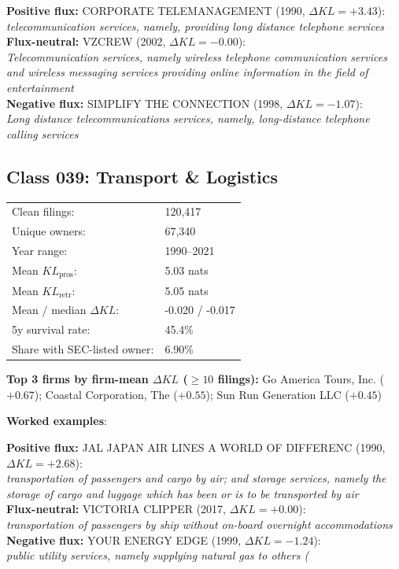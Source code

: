   \textbf{Positive flux:} \textsc{CORPORATE TELEMANAGEMENT} (1990, $\Delta KL=+3.43$):\\
  \textit{telecommunication services, namely, providing long distance telephone services}\\
  \textbf{Flux-neutral:} \textsc{VZCREW} (2002, $\Delta KL=-0.00$):\\
  \textit{Telecommunication services, namely wireless telephone communication services and wireless messaging services providing online information in the field of entertainment}\\
  \textbf{Negative flux:} \textsc{SIMPLIFY THE CONNECTION} (1998, $\Delta KL=-1.07$):\\
  \textit{Long distance telecommunications services, namely, long-distance telephone calling services}\\

\subsection*{Class 039: Transport \& Logistics}
\label{app:industry-039}

\begin{tabular}{ll}
Clean filings: & 120,417 \\
Unique owners: & 67,340 \\
Year range: & 1990--2021 \\
Mean $KL_\text{pros}$: & 5.03 nats \\
Mean $KL_\text{retr}$: & 5.05 nats \\
Mean / median $\Delta KL$: & -0.020 / -0.017 \\
5y survival rate: & 45.4\% \\
Share with SEC-listed owner: & 6.90\% \\
\end{tabular}

\textbf{Top 3 firms by firm-mean $\Delta KL$ ($\geq 10$ filings):} Go America Tours, Inc. ($+0.67$); Coastal Corporation, The ($+0.55$); Sun Run Generation LLC ($+0.45$)

\textbf{Worked examples}:

  \textbf{Positive flux:} \textsc{JAL JAPAN AIR LINES A WORLD OF DIFFERENC} (1990, $\Delta KL=+2.68$):\\
  \textit{transportation of passengers and cargo by air; and storage services, namely the storage of cargo and luggage which has been or is to be transported by air}\\
  \textbf{Flux-neutral:} \textsc{VICTORIA CLIPPER} (2017, $\Delta KL=+0.00$):\\
  \textit{transportation of passengers by ship without on-board overnight accommodations}\\
  \textbf{Negative flux:} \textsc{YOUR ENERGY EDGE} (1999, $\Delta KL=-1.24$):\\
  \textit{public utility services, namely supplying natural gas to others (}\\

